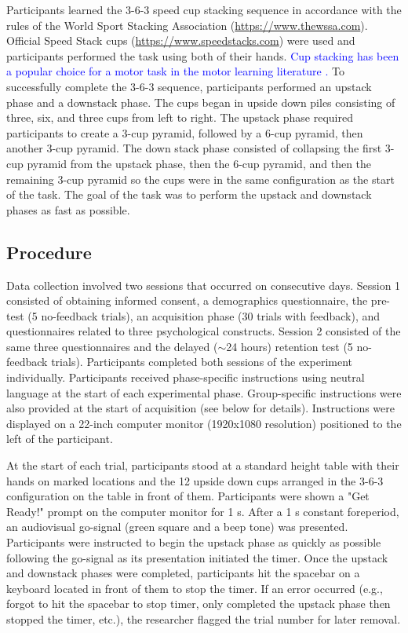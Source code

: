 \documentclass[man,floatsintext,donotrepeattitle,letterpaper,12pt]{apa7}
\begin{document}
Participants learned the 3-6-3 speed cup stacking sequence in accordance with the rules of the World Sport Stacking Association (\url{https://www.thewssa.com}). Official Speed Stack cups (\url{https://www.speedstacks.com}) were used and participants performed the task using both of their hands. \textcolor{blue}{Cup stacking has been a popular choice for a motor task in the motor learning literature \autocite[e.g.,][]{binks2023,brillinger2024,granados2007,hebert2018,stgermain2022}.} To successfully complete the 3-6-3 sequence, participants performed an upstack phase and a downstack phase. The cups began in upside down piles consisting of three, six, and three cups from left to right. The upstack phase required participants to create a 3-cup pyramid, followed by a 6-cup pyramid, then another 3-cup pyramid. The down stack phase consisted of collapsing the first 3-cup pyramid from the upstack phase, then the 6-cup pyramid, and then the remaining 3-cup pyramid so the cups were in the same configuration as the start of the task. The goal of the task was to perform the upstack and downstack phases as fast as possible.

\subsection{Procedure}

Data collection involved two sessions that occurred on consecutive days. Session 1 consisted of obtaining informed consent, a demographics questionnaire, the pre-test (5 no-feedback trials), an acquisition phase (30 trials with feedback), and questionnaires related to three psychological constructs. Session 2 consisted of the same three questionnaires and the delayed ($\sim$24 hours) retention test (5 no-feedback trials). Participants completed both sessions of the experiment individually. Participants received phase-specific instructions using neutral language at the start of each experimental phase. Group-specific instructions were also provided at the start of acquisition (see below for details). Instructions were displayed on a 22-inch computer monitor (1920x1080 resolution) positioned to the left of the participant.

At the start of each trial, participants stood at a standard height table with their hands on marked locations and the 12 upside down cups arranged in the 3-6-3 configuration on the table in front of them. Participants were shown a "Get Ready!" prompt on the computer monitor for 1 s. After a 1 s constant foreperiod, an audiovisual go-signal (green square and a beep tone) was presented. Participants were instructed to begin the upstack phase as quickly as possible following the go-signal as its presentation initiated the timer. Once the upstack and downstack phases were completed, participants hit the spacebar on a keyboard located in front of them to stop the timer. If an error occurred (e.g., forgot to hit the spacebar to stop timer, only completed the upstack phase then stopped the timer, etc.), the researcher flagged the trial number for later removal.
\end{document}
